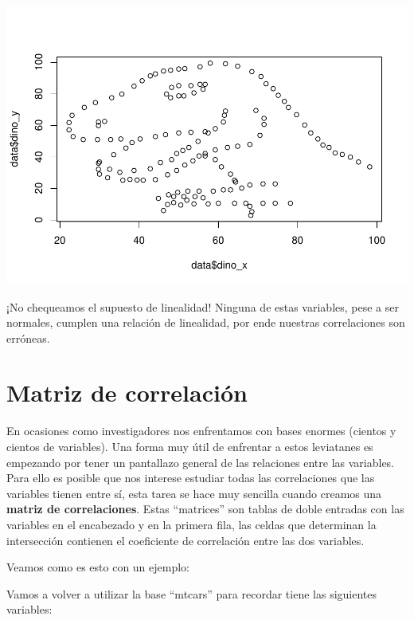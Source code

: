 \documentclass[
]{book}
\begin{document}
\includegraphics{Esatadistica_en_R_files/figure-latex/unnamed-chunk-218-1.pdf}

¡No chequeamos el supuesto de linealidad! Ninguna de estas variables, pese a ser normales, cumplen una relación de linealidad, por ende nuestras correlaciones son erróneas.

\hypertarget{matriz-de-correlaciuxf3n}{%
\section{Matriz de correlación}\label{matriz-de-correlaciuxf3n}}

En ocasiones como investigadores nos enfrentamos con bases enormes (cientos y cientos de variables). Una forma muy útil de enfrentar a estos leviatanes es empezando por tener un pantallazo general de las relaciones entre las variables. Para ello es posible que nos interese estudiar todas las correlaciones que las variables tienen entre sí, esta tarea se hace muy sencilla cuando creamos una \textbf{matriz de correlaciones}. Estas ``matrices'' son tablas de doble entradas con las variables en el encabezado y en la primera fila, las celdas que determinan la intersección contienen el coeficiente de correlación entre las dos variables.

Veamos como es esto con un ejemplo:

Vamos a volver a utilizar la base ``mtcars'' para recordar tiene las siguientes variables:
\end{document}

